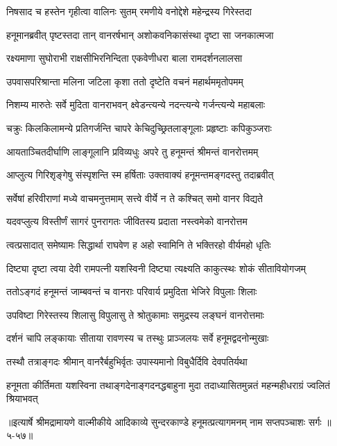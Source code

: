 \twolineshloka
{निषसाद च हस्तेन गृहीत्वा वालिनः सुतम्}
{रमणीये वनोद्देशे महेन्द्रस्य गिरेस्तदा} %

\twolineshloka
{हनूमानब्रवीत् पृष्टस्तदा तान् वानरर्षभान्}
{अशोकवनिकासंस्था दृष्टा सा जनकात्मजा} %

\twolineshloka
{रक्ष्यमाणा सुघोराभी राक्षसीभिरनिन्दिता}
{एकवेणीधरा बाला रामदर्शनलालसा} %

\twolineshloka
{उपवासपरिश्रान्ता मलिना जटिला कृशा}
{ततो दृष्टेति वचनं महार्थममृतोपमम्} %

\twolineshloka
{निशम्य मारुतेः सर्वे मुदिता वानराभवन्}
{क्ष्वेडन्त्यन्ये नदन्त्यन्ये गर्जन्त्यन्ये महाबलाः} %

\twolineshloka
{चक्रुः किलकिलामन्ये प्रतिगर्जन्ति चापरे}
{केचिदुच्छ्रितलाङ्गूलाः प्रहृष्टाः कपिकुञ्जराः} %

\twolineshloka
{आयताञ्चितदीर्घाणि लाङ्गूलानि प्रविव्यधुः}
{अपरे तु हनूमन्तं श्रीमन्तं वानरोत्तमम्} %

\twolineshloka
{आप्लुत्य गिरिशृङ्गेषु संस्पृशन्ति स्म हर्षिताः}
{उक्तवाक्यं हनूमन्तमङ्गदस्तु तदाब्रवीत्} %

\twolineshloka
{सर्वेषां हरिवीराणां मध्ये वाचमनुत्तमाम्}
{सत्त्वे वीर्ये न ते कश्चित् समो वानर विद्यते} %

\twolineshloka
{यदवप्लुत्य विस्तीर्णं सागरं पुनरागतः}
{जीवितस्य प्रदाता नस्त्वमेको वानरोत्तम} %

\twolineshloka
{त्वत्प्रसादात् समेष्यामः सिद्धार्था राघवेण ह}
{अहो स्वामिनि ते भक्तिरहो वीर्यमहो धृतिः} %

\twolineshloka
{दिष्ट्या दृष्टा त्वया देवी रामपत्नी यशस्विनी}
{दिष्ट्या त्यक्ष्यति काकुत्स्थः शोकं सीतावियोगजम्} %

\twolineshloka
{ततोऽङ्गदं हनूमन्तं जाम्बवन्तं च वानराः}
{परिवार्य प्रमुदिता भेजिरे विपुलाः शिलाः} %

\twolineshloka
{उपविष्टा गिरेस्तस्य शिलासु विपुलासु ते}
{श्रोतुकामाः समुद्रस्य लङ्घनं वानरोत्तमाः} %

\twolineshloka
{दर्शनं चापि लङ्कायाः सीताया रावणस्य च}
{तस्थुः प्राञ्जलयः सर्वे हनूमद्वदनोन्मुखाः} %

\twolineshloka
{तस्थौ तत्राङ्गदः श्रीमान् वानरैर्बहुभिर्वृतः}
{उपास्यमानो विबुधैर्दिवि देवपतिर्यथा} %

\twolineshloka
{हनूमता कीर्तिमता यशस्विना तथाङ्गदेनाङ्गदनद्धबाहुना}
{मुदा तदाध्यासितमुन्नतं महन्महीधराग्रं ज्वलितं श्रियाभवत्} %


॥इत्यार्षे श्रीमद्रामायणे वाल्मीकीये आदिकाव्ये सुन्दरकाण्डे हनूमत्प्रत्यागमनम् नाम सप्तपञ्चाशः सर्गः ॥५-५७॥

